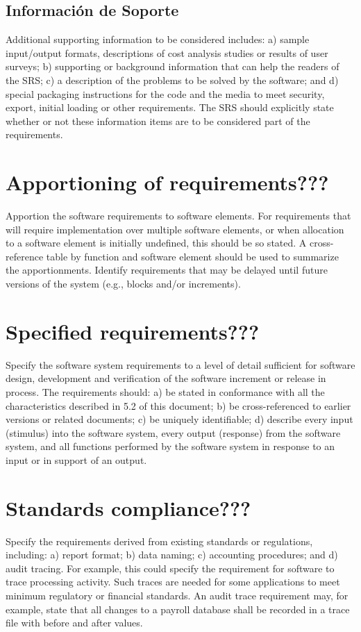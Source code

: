 \documentclass[12pt, a4paper, twoside]{article}
\begin{document}
 \subsection{Información de Soporte}
 Additional supporting information to be considered includes:
 a) sample input/output formats, descriptions of cost analysis studies or results of user surveys;
 b) supporting or background information that can help the readers of the SRS;
 c) a description of the problems to be solved by the software; and
 d) special packaging instructions for the code and the media to meet security, export, initial loading
 or other requirements.
 The SRS should explicitly state whether or not these information items are to be considered part of the
 requirements.

 \section{Apportioning of requirements???}
 Apportion the software requirements to software elements. For requirements that will require
 implementation over multiple software elements, or when allocation to a software element is initially
 undefined, this should be so stated. A cross-reference table by function and software element should be
 used to summarize the apportionments.
 Identify requirements that may be delayed until future versions of the system (e.g., blocks and/or
 increments).

 \section{Specified requirements???}
 Specify the software system requirements to a level of detail sufficient for software design, development
 and verification of the software increment or release in process.
 The requirements should:
 a) be stated in conformance with all the characteristics described in 5.2 of this document;
 b) be cross-referenced to earlier versions or related documents;
 c) be uniquely identifiable;
 d) describe every input (stimulus) into the software system, every output (response) from the
 software system, and all functions performed by the software system in response to an input or in
 support of an output.

 \section{Standards compliance???}
 Specify the requirements derived from existing standards or regulations, including:
 a) report format;
 b) data naming;
 c) accounting procedures; and
 d) audit tracing.
 For example, this could specify the requirement for software to trace processing activity. Such traces
 are needed for some applications to meet minimum regulatory or financial standards. An audit trace
 requirement may, for example, state that all changes to a payroll database shall be recorded in a trace
 file with before and after values.
\end{document}
